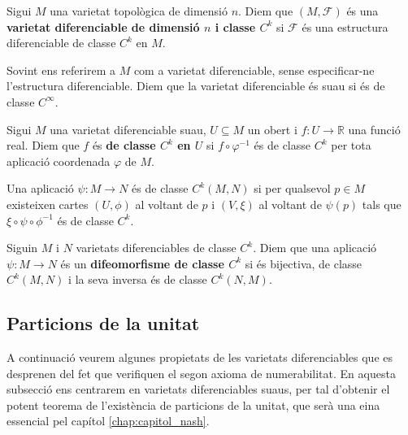 \begin{defi}
    Sigui $M$ una varietat topològica de dimensió $n$. Diem que $(M, \mathcal F)$ és una \textbf{varietat diferenciable de dimensió $n$ i classe $C^k$} si $\mathcal F$ és una estructura diferenciable de classe $C^k$ en $M$.
\end{defi}

\begin{nota}
    Sovint ens referirem a $M$ com a varietat diferenciable, sense especificar-ne l'estructura diferenciable. Diem que la varietat diferenciable és suau si és de classe $C^\infty$.
\end{nota}

\begin{defi}
    Sigui $M$ una varietat diferenciable suau, $U\subseteq M$ un obert i $f:U\to\mathbb R$ una funció real. Diem que $f$ és \textbf{de classe $C^k$ en $U$} si $f\circ\varphi^{-1}$ és de classe $C^k$ per tota aplicació coordenada $\varphi$ de $M$.

    Una aplicació $\psi:M\to N$ és de classe $C^k(M,N)$ si per qualsevol $p\in M$ existeixen cartes $(U,\phi)$ al voltant de $p$ i $(V,\xi)$ al voltant de $\psi(p)$ tals que $\xi\circ\psi\circ\phi^{-1}$ és de classe $C^k$.
\end{defi}

\begin{defi}
    Siguin $M$ i $N$ varietats diferenciables de classe $C^k$. Diem que una aplicació $\psi:M\to N$ és un \textbf{difeomorfisme de classe $C^k$} si és bijectiva, de classe $C^k(M,N)$ i la seva inversa és de classe $C^k(N,M)$.
\end{defi}

\subsection{Particions de la unitat}
A continuació veurem algunes propietats de les varietats diferenciables que es desprenen del fet que verifiquen el segon axioma de numerabilitat. En aquesta subsecció ens centrarem en varietats diferenciables suaus, per tal d'obtenir el potent teorema de l'existència de particions de la unitat, que serà una eina essencial pel capítol \ref{chap:capitol_nash}.

